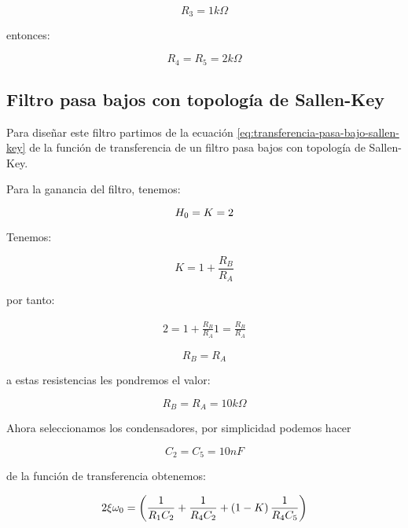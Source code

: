 $$\boxed{R_3 = 1k\Omega}$$

entonces:

\begin{equation*}
    \boxed{R_4 = R_5 = 2k\Omega}
\end{equation*}

\subsection{Filtro pasa bajos con topología de Sallen-Key}

Para diseñar este filtro partimos de la ecuación \ref{eq:transferencia-pasa-bajo-sallen-key} de la función de transferencia de un filtro pasa bajos con topología de Sallen-Key.

Para la ganancia del filtro, tenemos:

\begin{equation*}
    H_0 = K = 2
\end{equation*}

Tenemos:

\begin{equation}
    K = 1 + \frac{R_B}{R_A}
\end{equation}

por tanto:

\begin{align*}
    2 = 1 + \frac{R_B}{R_A}
    1 = \frac{R_B}{R_A}
\end{align*}

\begin{equation*}
    \boxed{R_B = R_A}
\end{equation*}

a estas resistencias les pondremos el valor:

\begin{equation*}
    \boxed{R_B = R_A = 10k\Omega}
\end{equation*}

Ahora seleccionamos los condensadores, por simplicidad podemos hacer

\begin{equation*}
    \boxed{C_2 = C_5 = 10nF}
\end{equation*}

de la función de transferencia obtenemos:

\begin{equation}
    2\xi \omega_0 = \left(\frac{1}{R_1 C_2} + \frac{1}{R_4 C_2} + \left(1 - K\right) \frac{1}{R_4 C_5}\right)
\end{equation}

